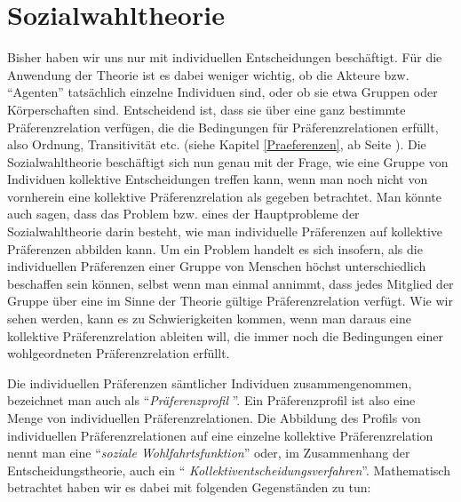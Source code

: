 \section{Sozialwahltheorie}
\label{Sozialwahltheorie}

Bisher haben wir uns nur mit individuellen Entscheidungen beschäftigt. Für die
Anwendung der Theorie ist es dabei weniger wichtig, ob die Akteure bzw.
"`Agenten"' tatsächlich einzelne Individuen sind, oder ob sie etwa Gruppen oder
Körperschaften sind. Entscheidend ist, dass sie über eine ganz bestimmte
Präferenzrelation verfügen, die die Bedingungen für Präferenzrelationen erfüllt,
also Ordnung, Transitivität etc. (siehe Kapitel \ref{Praeferenzen}, ab Seite
\pageref{Praeferenzen}).  Die
Sozialwahltheorie beschäftigt sich nun genau mit der Frage, wie eine Gruppe von
Individuen kollektive Entscheidungen treffen kann, wenn man noch nicht von
vornherein eine kollektive Präferenzrelation als gegeben betrachtet. Man könnte
auch sagen, dass das Problem bzw. eines der Hauptprobleme der Sozialwahltheorie
darin besteht, wie man individuelle Präferenzen auf kollektive Präferenzen
abbilden kann. Um ein Problem handelt es sich insofern, als die individuellen
Präferenzen einer Gruppe von Menschen höchst unterschiedlich beschaffen sein
können, selbst wenn man einmal annimmt, dass jedes Mitglied der Gruppe über eine
im Sinne der Theorie gültige Präferenzrelation verfügt. Wie wir sehen werden,
kann es zu Schwierigkeiten kommen, wenn man daraus eine kollektive
Präferenzrelation ableiten will, die immer noch die Bedingungen einer
wohlgeordneten Präferenzrelation erfüllt.

Die individuellen Präferenzen sämtlicher Individuen zusammengenommen, bezeichnet
man auch als "`{\em Präferenzprofil} "'. Ein Präferenzprofil ist also eine Menge
von individuellen Präferenzrelationen. Die
Abbildung des Profils von individuellen Präferenzrelationen auf eine einzelne
kollektive Präferenzrelation nennt man eine "`{\em soziale Wohlfahrtsfunktion}"'
oder, im Zusammenhang der Entscheidungstheorie, auch ein "`{\em
Kollektiventscheidungsverfahren}"'. Mathematisch betrachtet haben wir es dabei mit
folgenden Gegenständen zu tun:

